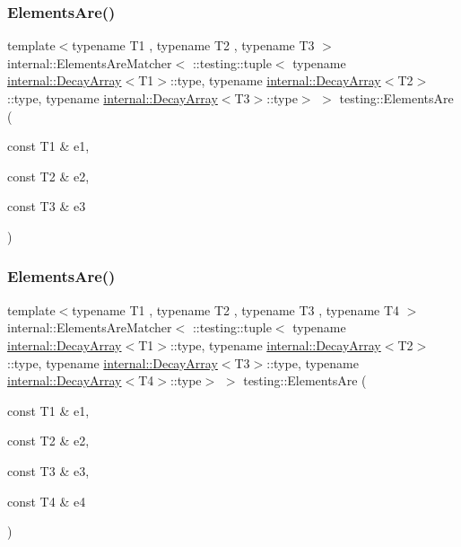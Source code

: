 \subsubsection{\texorpdfstring{ElementsAre()}{ElementsAre()}\hspace{0.1cm}{\footnotesize\ttfamily [4/11]}}
{\footnotesize\ttfamily template$<$typename T1 , typename T2 , typename T3 $>$ \\
internal\+::\+Elements\+Are\+Matcher$<$ \+::testing\+::tuple$<$ typename \mbox{\hyperlink{structtesting_1_1internal_1_1DecayArray}{internal\+::\+Decay\+Array}}$<$T1$>$\+::type, typename \mbox{\hyperlink{structtesting_1_1internal_1_1DecayArray}{internal\+::\+Decay\+Array}}$<$T2$>$\+::type, typename \mbox{\hyperlink{structtesting_1_1internal_1_1DecayArray}{internal\+::\+Decay\+Array}}$<$T3$>$\+::type$>$ $>$ testing\+::\+Elements\+Are (\begin{DoxyParamCaption}\item[{const T1 \&}]{e1,  }\item[{const T2 \&}]{e2,  }\item[{const T3 \&}]{e3 }\end{DoxyParamCaption})\hspace{0.3cm}{\ttfamily [inline]}}

\mbox{\label{namespacetesting_a4109ce480e0145bfce7c46120afb36d3}} 
\subsubsection{\texorpdfstring{ElementsAre()}{ElementsAre()}\hspace{0.1cm}{\footnotesize\ttfamily [5/11]}}
{\footnotesize\ttfamily template$<$typename T1 , typename T2 , typename T3 , typename T4 $>$ \\
internal\+::\+Elements\+Are\+Matcher$<$ \+::testing\+::tuple$<$ typename \mbox{\hyperlink{structtesting_1_1internal_1_1DecayArray}{internal\+::\+Decay\+Array}}$<$T1$>$\+::type, typename \mbox{\hyperlink{structtesting_1_1internal_1_1DecayArray}{internal\+::\+Decay\+Array}}$<$T2$>$\+::type, typename \mbox{\hyperlink{structtesting_1_1internal_1_1DecayArray}{internal\+::\+Decay\+Array}}$<$T3$>$\+::type, typename \mbox{\hyperlink{structtesting_1_1internal_1_1DecayArray}{internal\+::\+Decay\+Array}}$<$T4$>$\+::type$>$ $>$ testing\+::\+Elements\+Are (\begin{DoxyParamCaption}\item[{const T1 \&}]{e1,  }\item[{const T2 \&}]{e2,  }\item[{const T3 \&}]{e3,  }\item[{const T4 \&}]{e4 }\end{DoxyParamCaption})\hspace{0.3cm}{\ttfamily [inline]}}

